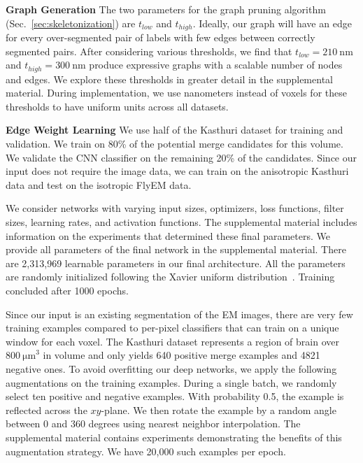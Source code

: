 \noindent\textbf{Graph Generation}
The two parameters for the graph pruning algorithm (Sec.~\ref{sec:skeletonization}) are $t_{low}$ and $t_{high}$. 
Ideally, our graph will have an edge for every over-segmented pair of labels with few edges between correctly segmented pairs. 
After considering various thresholds, we find that $t_{low} = \SI{210}{\nano\meter}$ and $t_{high} = \SI{300}{\nano\meter}$ produce expressive graphs with a scalable number of nodes and edges.
We explore these thresholds in greater detail in the supplemental material.
During implementation, we use nanometers instead of voxels for these thresholds to have uniform units across all datasets.


\noindent\textbf{Edge Weight Learning}
\label{sec:network-parameters}
We use half of the Kasthuri dataset for training and validation. 
We train on 80\% of the potential merge candidates for this volume.
We validate the CNN classifier on the remaining 20\% of the candidates. 
Since our input does not require the image data, we can train on the anisotropic Kasthuri data and test on the isotropic FlyEM data.

We consider networks with varying input sizes, optimizers, loss functions, filter sizes, learning rates, and activation functions. 
The supplemental material includes information on the experiments that determined these final parameters. 
We provide all parameters of the final network in the supplemental material. 
There are 2,313,969 learnable parameters in our final architecture. 
All the parameters are randomly initialized following the Xavier uniform distribution~\cite{glorot2010understanding}. 
Training concluded after 1000 epochs.

Since our input is an existing segmentation of the EM images, there are very few training examples compared to per-pixel classifiers that can train on a unique window for each voxel. 
The Kasthuri dataset represents a region of brain over $\SI[product-units=single]{800}{\micro\meter}^3$ in volume and only yields 640 positive merge examples and 4821 negative ones.
To avoid overfitting our deep networks, we apply the following augmentations on the training examples.
During a single batch, we randomly select ten positive and negative examples. 
With probability 0.5, the example is reflected across the $xy$-plane. 
We then rotate the example by a random angle between $0$ and $360$ degrees using nearest neighbor interpolation. 
The supplemental material contains experiments demonstrating the benefits of this augmentation strategy.
We have 20,000 such examples per epoch.

